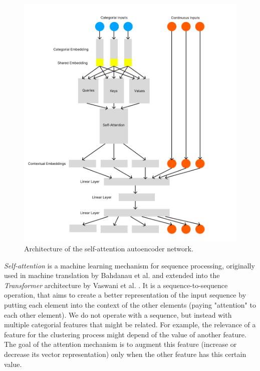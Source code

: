 \begin{figure}
\centering
	\includegraphics[width=1.2\linewidth]{attention_autoencoder.png}
	\caption{Architecture of the self-attention autoencoder network.}
	\label{attention_architecture}
\end{figure}

\textit{Self-attention} is a machine learning mechanism for sequence processing, originally used in machine translation by Bahdanau et al. \cite{bahdanau} and extended into the \textit{Transformer} architecture by Vaswani et al. \cite{attention_is_all_you_need}. It is a sequence-to-sequence operation, that aims to create a better representation of the input sequence by putting each element into the context of the other elements (paying "attention" to each other element). We do not operate with a sequence, but instead with multiple categorial features that might be related. For example, the relevance of a feature for the clustering process might depend of the value of another feature. The goal of the attention mechanism is to augment this feature (increase or decrease its vector representation) only when the other feature has this certain value. 

